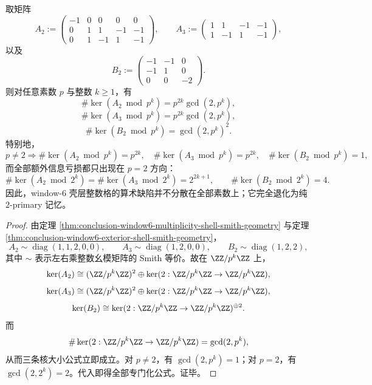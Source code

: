 \begin{corollary}\label{cor:conclusion-window6-shell-loss-pure-dyadic}
取矩阵
\[
A_2:=
\begin{pmatrix}
-1&0&0&0&0\\
0&1&1&-1&-1\\
0&1&-1&1&-1
\end{pmatrix},
\qquad
A_3:=
\begin{pmatrix}
1&1&-1&-1\\
1&-1&1&-1
\end{pmatrix},
\]
以及
\[
B_2:=
\begin{pmatrix}
-1&-1&0\\
-1&1&0\\
0&0&-2
\end{pmatrix}.
\]
则对任意素数 \(p\) 与整数 \(k\ge 1\)，有
\[
\#\ker(A_2\bmod p^k)=p^{2k}\gcd(2,p^k),
\]
\[
\#\ker(A_3\bmod p^k)=p^{2k}\gcd(2,p^k),
\]
\[
\#\ker(B_2\bmod p^k)=\gcd(2,p^k)^2.
\]
特别地，
\[
p\neq 2
\Longrightarrow
\#\ker(A_2\bmod p^k)=p^{2k},\quad
\#\ker(A_3\bmod p^k)=p^{2k},\quad
\#\ker(B_2\bmod p^k)=1,
\]
而全部额外信息亏损都只出现在 \(p=2\) 方向：
\[
\#\ker(A_2\bmod 2^k)=\#\ker(A_3\bmod 2^k)=2^{2k+1},
\qquad
\#\ker(B_2\bmod 2^k)=4.
\]
因此，window-\(6\) 壳层整数格的算术缺陷并不分散在全部素数上；它完全退化为纯 \(2\)-primary 记忆。
\end{corollary}
\begin{proof}
由定理 \ref{thm:conclusion-window6-multiplicity-shell-smith-geometry} 与定理 \ref{thm:conclusion-window6-exterior-shell-smith-geometry}，
\[
A_2\sim \operatorname{diag}(1,1,2,0,0),\qquad
A_3\sim \operatorname{diag}(1,2,0,0),\qquad
B_2\sim \operatorname{diag}(1,2,2),
\]
其中 \(\sim\) 表示左右乘整数幺模矩阵的 Smith 等价。故在 \(\ZZ/p^k\ZZ\) 上，
\[
\ker(A_2)\cong (\ZZ/p^k\ZZ)^2\oplus \ker(2:\ZZ/p^k\ZZ\to\ZZ/p^k\ZZ),
\]
\[
\ker(A_3)\cong (\ZZ/p^k\ZZ)^2\oplus \ker(2:\ZZ/p^k\ZZ\to\ZZ/p^k\ZZ),
\]
\[
\ker(B_2)\cong \ker(2:\ZZ/p^k\ZZ\to\ZZ/p^k\ZZ)^{\oplus 2}.
\]
而
\[
\#\ker(2:\ZZ/p^k\ZZ\to\ZZ/p^k\ZZ)=\gcd(2,p^k),
\]
从而三条核大小公式立即成立。对 \(p\neq 2\)，有 \(\gcd(2,p^k)=1\)；对 \(p=2\)，有 \(\gcd(2,2^k)=2\)。代入即得全部专门化公式。证毕。
\end{proof}


